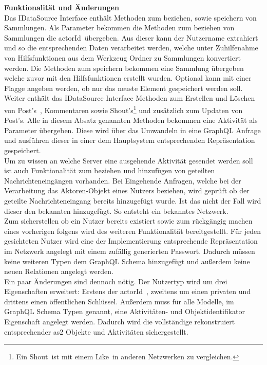 \begingroup
	\fontsize{18pt}{12pt}\selectfont
	\textbf{Funktionalität und Änderungen}
	\vspace{4pt}
\endgroup\\
Das IDataSource Interface enthält Methoden zum beziehen, sowie speichern von Sammlungen. Als Parameter bekommen die Methoden zum beziehen von Sammlungen die \glqq actorId\grqq~übergeben. Aus dieser kann der Nutzername extrahiert und so die entsprechenden Daten verarbeitet werden, welche unter Zuhilfenahme von Hilfsfunktionen aus dem Werkzeug Ordner zu Sammlungen konvertiert werden. Die Methoden zum speichern bekommen eine Sammlung übergeben welche zuvor mit den Hilfsfunktionen erstellt wurden. Optional kann mit einer Flagge angeben werden, ob nur das neuste Element gespeichert werden soll.\\

Weiter enthält das IDataSource Interface Methoden zum Erstellen und Löschen von \glqq Post's\grqq~, Kommentaren sowie \glqq Shout's\grqq\footnote{Ein \glqq Shout\grqq~ist mit einem \glqq Like\grqq~in anderen Netzwerken zu vergleichen.} und zusätzlich zum Updaten von \glqq Post's\grqq. Alle in diesem Absatz genannten Methoden bekommen eine Aktivität als Parameter übergeben. Diese wird über das Umwandeln in eine GraphQL Anfrage und ausführen dieser in einer dem Hauptsystem entsprechenden Repräsentation gespeichert.\\

Um zu wissen an welche Server eine ausgehende Aktivität gesendet werden soll ist auch Funktionalität zum beziehen und hinzufügen von geteilten Nachrichteneingängen vorhanden. Bei Eingehende Anfragen, welche bei der Verarbeitung das Aktoren-Objekt eines Nutzers beziehen, wird geprüft ob der geteilte Nachrichteneingang bereits hinzugefügt wurde. Ist das nicht der Fall wird dieser den bekannten hinzugefügt. So entsteht ein \glqq bekanntes Netzwerk\grqq.\\

Zum sicherstellen ob ein Nutzer bereits existiert sowie zum rückgängig machen eines vorherigen folgens wird des weiteren Funktionalität bereitgestellt. Für jeden gesichteten Nutzer wird eine der Implementierung entsprechende Repräsentation im Netzwerk angelegt mit einem zufällig generierten Passwort. Dadurch müssen keine weiteren Typen dem GraphQL Schema hinzugefügt und außerdem keine neuen Relationen angelegt werden.\\

Ein paar Änderungen sind dennoch nötig. Der Nutzertyp wird um drei Eigenschaften erweitert: Erstens der \glqq actorId\grqq~, zweitens um einen privaten und drittens einen öffentlichen Schlüssel. Außerdem muss für alle Modelle, im GraphQL Schema Typen genannt, eine Aktivitäten- und Objektidentifikator Eigenschaft angelegt werden. Dadurch wird die vollständige rekonstruiert entsprechender \gls{as2} Objekte und Aktivitäten sichergestellt.\\

